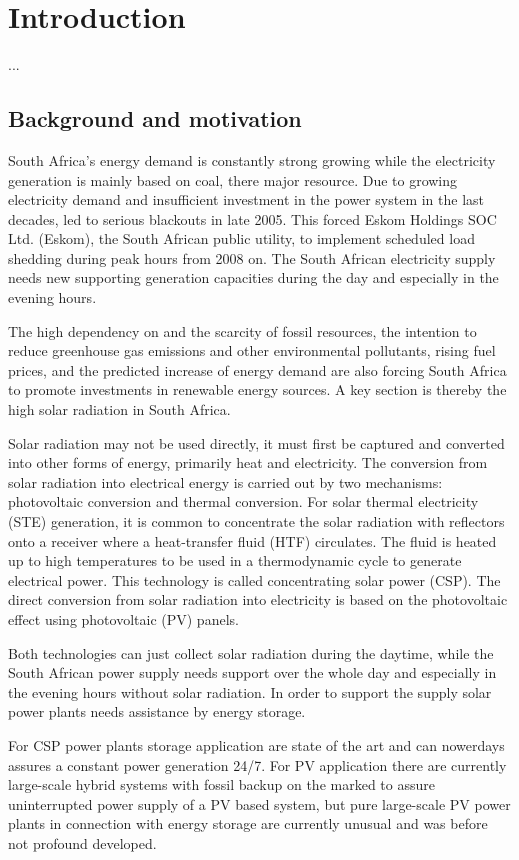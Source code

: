 \chapter{Introduction}
... %

\section{Background and motivation}
South Africa's energy demand is constantly strong growing while the electricity generation is mainly based on coal, there major resource. Due to growing electricity demand and insufficient investment in the power system in the last decades, led to serious blackouts in late 2005. This forced Eskom Holdings SOC Ltd. (Eskom), the South African public utility, to implement scheduled load shedding during peak hours from 2008 on. The South African electricity supply needs new supporting generation capacities during the day and especially in the evening hours. 

The high dependency on and the scarcity of fossil resources, the intention to reduce greenhouse gas emissions and other environmental pollutants, rising fuel prices, and the predicted increase of energy demand are also forcing South Africa to promote investments in renewable energy sources. A key section is thereby the high solar radiation in South Africa.

Solar radiation may not be used directly, it must first be captured and converted into other forms of energy, primarily heat and electricity. The conversion from solar radiation into electrical energy is carried out by two mechanisms: photovoltaic conversion and thermal conversion. For solar thermal electricity (STE) generation, it is common to concentrate the solar radiation with reflectors onto a receiver where a heat-transfer fluid (HTF) circulates. The fluid is heated up to high temperatures to be used in a thermodynamic cycle to generate electrical power. This technology is called concentrating solar power (CSP). The direct conversion from solar radiation into electricity is based on the photovoltaic effect using photovoltaic (PV) panels. 

Both technologies can just collect solar radiation during the daytime, while the South African power supply needs support over the whole day and especially in the evening hours without solar radiation. In order to support the supply solar power plants needs assistance by energy storage. 

For CSP power plants storage application are state of the art and can nowerdays assures a constant power generation 24/7. For PV application there are currently large-scale hybrid systems with fossil backup on the marked \cite{BELECTRIC2015} to assure uninterrupted power supply of a PV based system, but pure large-scale PV power plants in connection with energy storage are currently unusual and was before not profound developed. 

